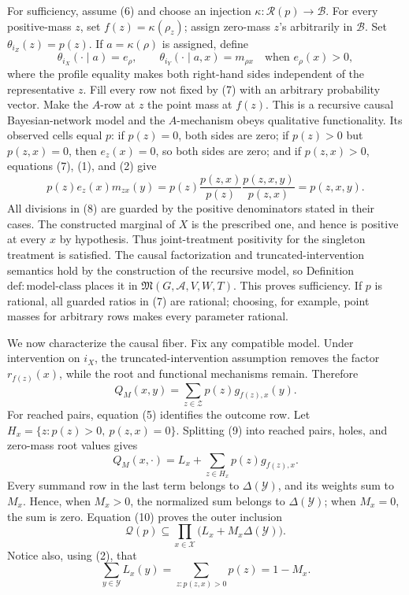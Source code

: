 For sufficiency, assume (6) and choose an injection
\(\kappa:\mathcal R(p)\to\mathcal B\).  For every positive-mass \(z\),
set \(f(z)=\kappa(\rho_z)\); assign zero-mass \(z\)'s arbitrarily in
\(\mathcal B\).  Set \(\theta_{i_Z}(z)=p(z)\).  If
\(a=\kappa(\rho)\) is assigned, define
\[
 \theta_{i_X}(\cdot\mid a)=e_\rho,
 \qquad
 \theta_{i_Y}(\cdot\mid a,x)=m_{\rho x}
 \quad\text{when }e_\rho(x)>0,
\tag{7}
\]
where the profile equality makes both right-hand sides independent of the
representative \(z\).  Fill every row not fixed by (7) with an arbitrary
probability vector.  Make the \(A\)-row at \(z\) the point mass at
\(f(z)\).  This is a recursive causal Bayesian-network model and the
\(A\)-mechanism obeys qualitative functionality.  Its observed cells equal
\(p\): if \(p(z)=0\), both sides are zero; if \(p(z)>0\) but
\(p(z,x)=0\), then \(e_z(x)=0\), so both sides are zero; and if
\(p(z,x)>0\), equations (7), (1), and (2) give
\[
 p(z)e_z(x)m_{zx}(y)
 =p(z)\frac{p(z,x)}{p(z)}
       \frac{p(z,x,y)}{p(z,x)}
 =p(z,x,y).
\tag{8}
\]
All divisions in (8) are guarded by the positive denominators stated in
their cases.  The constructed marginal of \(X\) is the prescribed one,
and hence is positive at every \(x\) by hypothesis.  Thus joint-treatment
positivity for the singleton treatment is satisfied.  The causal
factorization and truncated-intervention semantics hold by the construction
of the recursive model, so Definition~\(\mathrm{def:model\text{-}class}\)
places it in \(\mathfrak M(G,\mathcal A,V,W,T)\).  This proves sufficiency.
If \(p\) is rational, all guarded ratios in (7) are rational; choosing, for
example, point masses for arbitrary rows makes every parameter rational.

We now characterize the causal fiber.  Fix any compatible model.  Under
intervention on \(i_X\), the truncated-intervention assumption removes the
factor \(r_{f(z)}(x)\), while the root and functional mechanisms remain.
Therefore
\[
 Q_M(x,y)=\sum_{z\in\mathcal Z}p(z)g_{f(z),x}(y).
\tag{9}
\]
For reached pairs, equation (5) identifies the outcome row.  Let
\(H_x=\{z:p(z)>0,\ p(z,x)=0\}\).  Splitting (9) into reached pairs,
holes, and zero-mass root values gives
\[
 Q_M(x,\cdot)
 =L_x+\sum_{z\in H_x}p(z)g_{f(z),x}.
\tag{10}
\]
Every summand row in the last term belongs to
\(\Delta(\mathcal Y)\), and its weights sum to \(M_x\).  Hence, when
\(M_x>0\), the normalized sum belongs to \(\Delta(\mathcal Y)\); when
\(M_x=0\), the sum is zero.  Equation (10) proves the outer inclusion
\[
 \mathcal Q(p)\subseteq
 \prod_{x\in\mathcal X}\bigl(L_x+M_x\Delta(\mathcal Y)\bigr).
\tag{11}
\]
Notice also, using (2), that
\[
 \sum_{y\in\mathcal Y}L_x(y)
 =\sum_{z:p(z,x)>0}p(z)=1-M_x.
\tag{12}
\]

